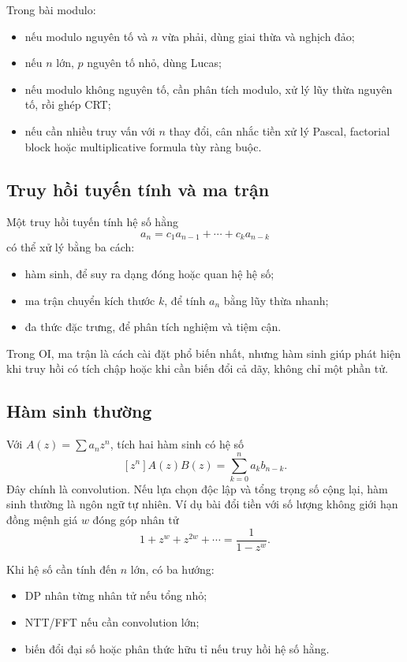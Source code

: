 \documentclass[11pt]{article}
\begin{document}
Trong bài modulo:
\begin{itemize}
  \item nếu modulo nguyên tố và \(n\) vừa phải, dùng giai thừa và nghịch đảo;
  \item nếu \(n\) lớn, \(p\) nguyên tố nhỏ, dùng Lucas;
  \item nếu modulo không nguyên tố, cần phân tích modulo, xử lý lũy thừa nguyên
        tố, rồi ghép CRT;
  \item nếu cần nhiều truy vấn với \(n\) thay đổi, cân nhắc tiền xử lý Pascal,
        factorial block hoặc multiplicative formula tùy ràng buộc.
\end{itemize}

\subsection{Truy hồi tuyến tính và ma trận}

Một truy hồi tuyến tính hệ số hằng
\[
  a_n=c_1a_{n-1}+\cdots+c_ka_{n-k}
\]
có thể xử lý bằng ba cách:
\begin{itemize}
  \item hàm sinh, để suy ra dạng đóng hoặc quan hệ hệ số;
  \item ma trận chuyển kích thước \(k\), để tính \(a_n\) bằng lũy thừa nhanh;
  \item đa thức đặc trưng, để phân tích nghiệm và tiệm cận.
\end{itemize}
Trong OI, ma trận là cách cài đặt phổ biến nhất, nhưng hàm sinh giúp phát hiện
khi truy hồi có tích chập hoặc khi cần biến đổi cả dãy, không chỉ một phần tử.

\subsection{Hàm sinh thường}

Với \(A(z)=\sum a_nz^n\), tích hai hàm sinh có hệ số
\[
  [z^n]A(z)B(z)=\sum_{k=0}^n a_k b_{n-k}.
\]
Đây chính là convolution. Nếu lựa chọn độc lập và tổng trọng số cộng lại, hàm
sinh thường là ngôn ngữ tự nhiên. Ví dụ bài đổi tiền với số lượng không giới
hạn đồng mệnh giá \(w\) đóng góp nhân tử
\[
  1+z^w+z^{2w}+\cdots=\frac{1}{1-z^w}.
\]

Khi hệ số cần tính đến \(n\) lớn, có ba hướng:
\begin{itemize}
  \item DP nhân từng nhân tử nếu tổng nhỏ;
  \item NTT/FFT nếu cần convolution lớn;
  \item biến đổi đại số hoặc phân thức hữu tỉ nếu truy hồi hệ số hằng.
\end{itemize}
\end{document}
